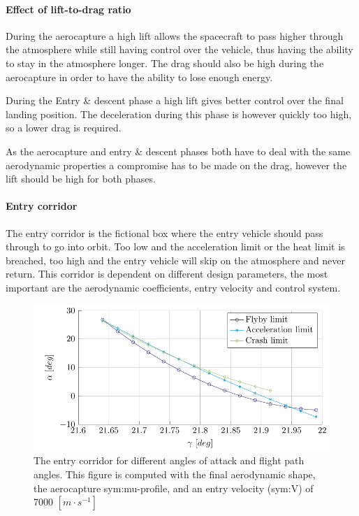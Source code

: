\paragraph{Effect of lift-to-drag ratio}
During the aerocapture a high lift allows the spacecraft to pass higher through the atmosphere while still having control over the vehicle, thus having the ability to stay in the atmosphere longer. The drag should also be high during the aerocapture in order to have the ability to lose enough energy.

During the Entry \& descent phase a high lift gives better control over the final landing position. The deceleration during this phase is however quickly too high, so a lower drag is required.

As the aerocapture and entry \& descent phases both have to deal with the same aerodynamic properties a compromise has to be made on the drag, however the lift should be high for both phases.

\paragraph{Entry corridor}
The entry corridor is the fictional box where the entry vehicle should pass through to go into orbit. Too low and the acceleration limit or the heat limit is breached, too high and the entry vehicle will skip on the atmosphere and never return. This corridor is dependent on different design parameters, the most important are the aerodynamic coefficients, entry velocity and control system.

\begin{figure}[h]
	\centering
	\includegraphics[width=\textwidth]{./Figure/orbit/alpha_gamma.pdf}
	\caption[The entry corridor for different angles of attack and flight path angles]{The entry corridor for different angles of attack and flight path angles. This figure is computed with the final aerodynamic shape, the aerocapture \gls{sym:mu}-profile, and an entry velocity (\gls{sym:V}) of 7000 $\left[m\cdot s^{-1}\right]$}
	\label{fig:alpha_gamma}
\end{figure}

